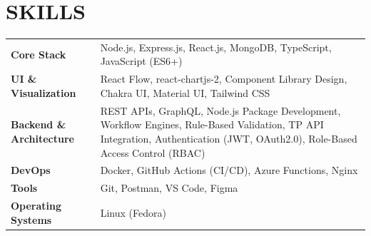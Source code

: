 \documentclass[10pt,a4paper]{moderncv}
\begin{document}
\section{SKILLS}

\begin{tabularx}{\textwidth}{>{\bfseries}l@{\hskip 3mm}X}
Core Stack & Node.js, Express.js, React.js, MongoDB, TypeScript, JavaScript (ES6+) \\
UI \& Visualization & React Flow, react-chartjs-2, Component Library Design, Chakra UI, Material UI, Tailwind CSS \\
Backend \& Architecture & REST APIs, GraphQL, Node.js Package Development, Workflow Engines, Rule-Based Validation, TP API Integration, Authentication (JWT, OAuth2.0), Role-Based Access Control (RBAC) \\
DevOps & Docker, GitHub Actions (CI/CD), Azure Functions, Nginx \\
Tools & Git, Postman, VS Code, Figma \\
Operating Systems & Linux (Fedora) \\
\end{tabularx}
\end{document}
